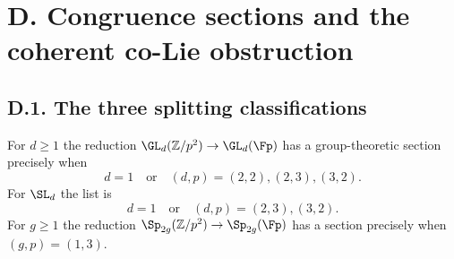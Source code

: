 \section{D. Congruence sections and the coherent co-Lie obstruction}
\subsection{D.1. The three splitting classifications}

\begin{theorem}\label{thm:DE-split}
For $d\geq 1$ the reduction $\GL_d(\mathbb Z/p^2)\to\GL_d(\Fp)$ has a group-theoretic section precisely when
\[
 d=1\quad\text{or}\quad(d,p)=(2,2),(2,3),(3,2).
\]
For $\SL_d$ the list is
\[
 d=1\quad\text{or}\quad(d,p)=(2,3),(3,2).
\]
For $g\geq1$ the reduction $\Sp_{2g}(\mathbb Z/p^2)\to\Sp_{2g}(\Fp)$ has a section precisely when $(g,p)=(1,3)$.
\end{theorem}

